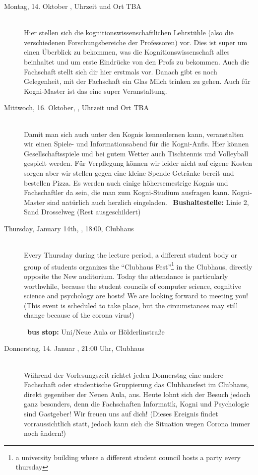 \begin{description}
\ifkogwiss
\item[Montag, 14. Oktober \YEAR, Uhrzeit und Ort TBA]\ \\
    Hier stellen sich die kognitionswissenschaftlichen Lehrstühle (also die verschiedenen Forschungsbereiche der Professoren) vor. Dies ist super um einen Überblick zu bekommen, was die Kognitionswissenschaft alles beinhaltet und um erste Eindrücke von den Profs zu bekommen. Auch die Fachschaft stellt sich dir hier erstmals vor. Danach gibt es noch Gelegenheit, mit der Fachschaft ein Glas Milch trinken zu gehen. Auch für Kogni-Master ist das eine super Veranstaltung.
\fi

\ifkogwiss
    \item[Mittwoch, 16. Oktober, \YEAR, Uhrzeit und Ort TBA]\ \\
         Damit man sich auch unter den Kognis kennenlernen kann, veranstalten wir einen Spiele- und Informationsabend für die Kogni-Anfis. Hier können Gesellschaftsspiele und bei gutem Wetter auch Tischtennis und Volleyball gespielt werden. Für Verpflegung können wir leider nicht auf eigene Kosten sorgen aber wir stellen gegen eine kleine Spende Getränke bereit und bestellen Pizza. Es werden auch einige höhersemestrige Kognis und Fachschaftler da sein, die man zum Kogni-Studium ausfragen kann. Kogni-Master sind natürlich auch herzlich eingeladen.
	~\textbf{Bushaltestelle:} Linie 2, Sand Drosselweg (Rest ausgeschildert)
\fi

\ifml
    \item[Thursday, January 14th, \YEAR, 18:00, Clubhaus]\ \\
        Every Thursday during the lecture period, a different student body or group of students organizes the "`Clubhaus Fest"'\footnote{a university building where a different student council hosts a party every thursday} in the Clubhaus, directly opposite the New auditorium. Today the attendance is particularly worthwhile, because the student councils of computer science, cognitive science and psychology are hosts! We are looking forward to meeting you!(This event is scheduled to take place, but the circumstances may still change because of the corona virus!)

        ~\textbf{bus stop:} Uni/Neue Aula or Hölderlinstraße
\else
    \item[Donnerstag, 14. Januar \YEAR, 21:00 Uhr, Clubhaus ]\ \\
        Während der Vorlesungszeit richtet jeden Donnerstag eine andere Fachschaft oder studentische Gruppierung das Clubhausfest im Clubhaus, direkt gegenüber der Neuen Aula, aus. Heute lohnt sich der Besuch jedoch ganz besonders, denn die Fachschaften Informatik, Kogni und Psychologie sind Gastgeber! Wir freuen uns auf dich! (Dieses Ereignis findet vorraussichtlich statt, jedoch kann sich die Situation wegen Corona immer noch ändern!)


\end{description}
